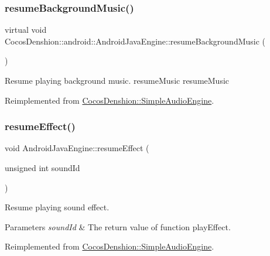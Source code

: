 \subsubsection{\texorpdfstring{resume\+Background\+Music()}{resumeBackgroundMusic()}\hspace{0.1cm}{\footnotesize\ttfamily [2/2]}}
{\footnotesize\ttfamily virtual void Cocos\+Denshion\+::android\+::\+Android\+Java\+Engine\+::resume\+Background\+Music (\begin{DoxyParamCaption}{ }\end{DoxyParamCaption})\hspace{0.3cm}{\ttfamily [virtual]}}

Resume playing background music.  resume\+Music  resume\+Music 

Reimplemented from \hyperlink{classCocosDenshion_1_1SimpleAudioEngine_a565f2d3e28072b6a7173064b797767c0}{Cocos\+Denshion\+::\+Simple\+Audio\+Engine}.

\mbox{\label{classCocosDenshion_1_1android_1_1AndroidJavaEngine_a0403188379ce32b1598292bcdf49c07d}} 
\subsubsection{\texorpdfstring{resume\+Effect()}{resumeEffect()}\hspace{0.1cm}{\footnotesize\ttfamily [1/2]}}
{\footnotesize\ttfamily void Android\+Java\+Engine\+::resume\+Effect (\begin{DoxyParamCaption}\item[{unsigned int}]{sound\+Id }\end{DoxyParamCaption})\hspace{0.3cm}{\ttfamily [virtual]}}

Resume playing sound effect.


\begin{DoxyParams}{Parameters}
{\em sound\+Id} & The return value of function play\+Effect. \\
\hline
\end{DoxyParams}


Reimplemented from \hyperlink{classCocosDenshion_1_1SimpleAudioEngine_a326bb76e2cc33a22629ac794345e7b18}{Cocos\+Denshion\+::\+Simple\+Audio\+Engine}.

